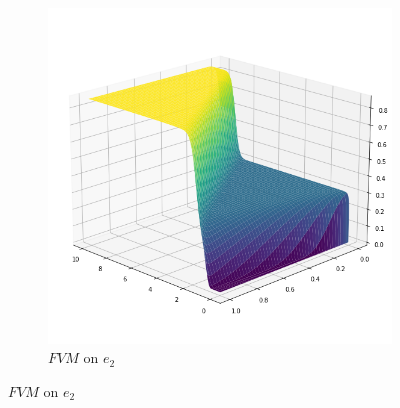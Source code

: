 \begin{figure}[H]
\begin{center}
\begin{subfigure}[b]{0.4\textwidth}
\begin{center}
                \includegraphics[scale=0.35]{img/FVM2.png}
            \end{center}
            \caption{$FVM$ on $e_2$}
        \end{subfigure}
    \end{center}
\end{figure}
